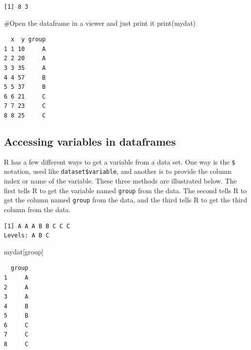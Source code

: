 \documentclass[
  letterpaper,
  DIV=11,
  numbers=noendperiod]{scrreprt}
\newenvironment{Shaded}{\begin{snugshade}}{\end{snugshade}}
\newcommand{\CommentTok}[1]{\textcolor[rgb]{0.37,0.37,0.37}{#1}}
\newcommand{\FunctionTok}[1]{\textcolor[rgb]{0.28,0.35,0.67}{#1}}
\newcommand{\NormalTok}[1]{\textcolor[rgb]{0.00,0.23,0.31}{#1}}
\newcommand{\SpecialCharTok}[1]{\textcolor[rgb]{0.37,0.37,0.37}{#1}}
\newcommand{\StringTok}[1]{\textcolor[rgb]{0.13,0.47,0.30}{#1}}
\begin{document}
\begin{verbatim}
[1] 8 3
\end{verbatim}

\begin{Shaded}
\begin{Highlighting}[]
\CommentTok{\#Open the dataframe in a viewer and just print it}
\FunctionTok{print}\NormalTok{(mydat)}
\end{Highlighting}
\end{Shaded}

\begin{verbatim}
  x  y group
1 1 10     A
2 2 20     A
3 3 35     A
4 4 57     B
5 5 37     B
6 6 21     C
7 7 23     C
8 8 25     C
\end{verbatim}

\hypertarget{accessing-variables-in-dataframes}{%
\subsection{Accessing variables in
dataframes}\label{accessing-variables-in-dataframes}}

R has a few different ways to get a variable from a data set. One way is
the \texttt{\$} notation, used like \texttt{dataset\$variable}, and
another is to provide the column index or name of the variable. These
three methods are illustrated below. The first tells R to get the
variable named \texttt{group} from the data. The second tells R to get
the column named \texttt{group} from the data, and the third tells R to
get the third column from the data.

\begin{Shaded}
\end{Shaded}

\begin{verbatim}
[1] A A A B B C C C
Levels: A B C
\end{verbatim}

\begin{Shaded}
\begin{Highlighting}[]
\NormalTok{mydat[}\StringTok{\textquotesingle{}group\textquotesingle{}}\NormalTok{] }
\end{Highlighting}
\end{Shaded}

\begin{verbatim}
  group
1     A
2     A
3     A
4     B
5     B
6     C
7     C
8     C
\end{verbatim}
\end{document}
